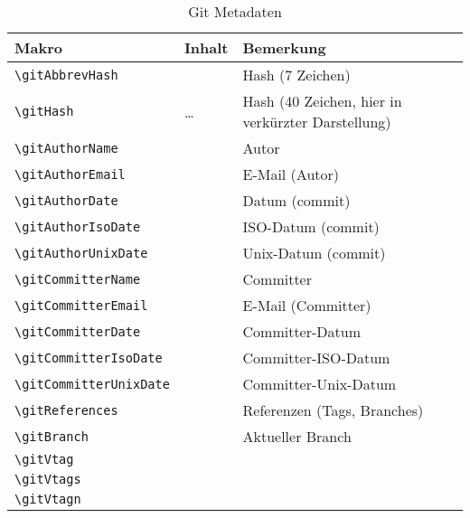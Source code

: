 %
%
	\label{sec:Gitinfo2}



\begin{table}
	\caption{Git Metadaten}
	\footnotesize
	\begin{tabularx}{\textwidth}{lFF} \hline
		Makro & Inhalt & Bemerkung \\ \hline
		\verb_\gitAbbrevHash_ &
			\gitAbbrevHash &
			Hash (7 Zeichen) \\
		\verb_\gitHash_ &
			\gitAbbrevHash\ldots &
			Hash (40 Zeichen, hier in verkürzter Darstellung) \\ \hline
		\verb_\gitAuthorName_ &
			\gitAuthorName &
			Autor \\
		\verb_\gitAuthorEmail_ &
			\gitAuthorEmail &
			E-Mail (Autor) \\
		\verb_\gitAuthorDate_ &
			\gitAuthorDate &
			Datum (commit) \\
		\verb_\gitAuthorIsoDate_ &
			\gitAuthorIsoDate &
			ISO-Datum (commit) \\
		\verb_\gitAuthorUnixDate_ &
			\gitAuthorUnixDate &
			Unix-Datum (commit) \\ \hline
		\verb_\gitCommitterName_ &
			\gitCommitterName &
			Committer \\
		\verb_\gitCommitterEmail_ &
			\gitCommitterEmail &
			E-Mail (Committer) \\
		\verb_\gitCommitterDate_ &
			\gitCommitterDate &
			Committer-Datum \\
		\verb_\gitCommitterIsoDate_ &
			\gitCommitterIsoDate &
			Committer-ISO-Datum \\
		\verb_\gitCommitterUnixDate_ &
			\gitCommitterUnixDate &
			Committer-Unix-Datum \\ \hline
		\verb_\gitReferences_ &
			\gitReferences &
			Referenzen (Tags, Branches) \\
		\verb_\gitBranch_ &
			\gitBranch &
			Aktueller Branch \\ \hline
		\verb_\gitVtag_ &
			\gitVtag &
			\\
		\verb_\gitVtags_ &
			\gitVtags &
			\\
		\verb_\gitVtagn_ &
			\gitVtagn &
			\\ \hline

\end{tabularx}
\end{table}
